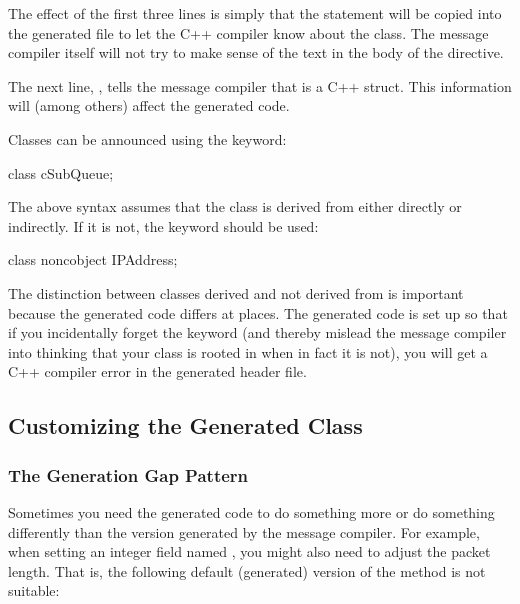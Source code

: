 The effect of the first three lines is simply that the 
statement will be copied into the generated 
file to let the C++ compiler know about the  class.
The message compiler itself will not try to make sense of the
text in the body of the  directive.

The next line, , tells the message compiler that
 is a C++ struct. This information will (among others)
affect the generated code.

Classes can be announced using the  keyword:

\begin{msg}
class cSubQueue;
\end{msg}

The above syntax assumes that the class is derived from 
either directly or indirectly. If it is not, the 
keyword should be used:

\begin{msg}
class noncobject IPAddress;
\end{msg}

The distinction between classes derived and not derived from 
is important because the generated code differs at places.
The generated code is set up so that if you incidentally
forget the  keyword (and thereby mislead the
message compiler into thinking that your class is rooted in
 when in fact it is not), you will get a C++ compiler
error in the generated header file.


\subsection{Customizing the Generated Class}
\label{sec:ch-messages:customizing-generated-class}


\subsubsection{The Generation Gap Pattern}

Sometimes you need the generated code to do something
more or do something differently than the version generated
by the message compiler.
For example, when setting an integer field named ,
you might also need to adjust the packet length. That is,
the following default (generated) version of the
 method is not suitable:

